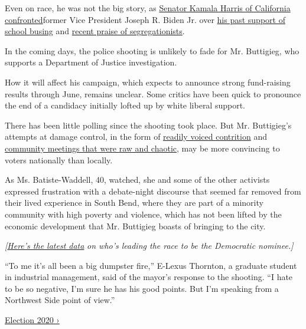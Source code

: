 Even on race, he was not the big story, as
\href{https://www.nytimes3xbfgragh.onion/2019/06/27/us/politics/kamala-harris-busing-joe-biden.html}{Senator
Kamala Harris of California confronted}former Vice President Joseph R.
Biden Jr. over
\href{https://www.nytimes3xbfgragh.onion/2019/06/27/us/politics/factcheck-democratic-debate.html}{his
past support of school busing} and
\href{https://www.nytimes3xbfgragh.onion/2019/06/20/us/politics/joe-biden-segregationists.html}{recent
praise of segregationists}.

In the coming days, the police shooting is unlikely to fade for Mr.
Buttigieg, who supports a Department of Justice investigation.

How it will affect his campaign, which expects to announce strong
fund-raising results through June, remains unclear. Some critics have
been quick to pronounce the end of a candidacy initially lofted up by
white liberal support.

There has been little polling since the shooting took place. But Mr.
Buttigieg's attempts at damage control, in the form of
\href{https://www.nytimes3xbfgragh.onion/2019/06/24/us/politics/pete-buttigieg-south-bend-shooting.html}{readily
voiced contrition} and
\href{https://www.nytimes3xbfgragh.onion/2019/06/23/us/politics/buttigieg-south-bend-shooting.html?searchResultPosition=1}{community
meetings that were raw and chaotic}, may be more convincing to voters
nationally than locally.

As Ms. Batiste-Waddell, 40, watched, she and some of the other activists
expressed frustration with a debate-night discourse that seemed far
removed from their lived experience in South Bend, where they are part
of a minority community with high poverty and violence, which has not
been lifted by the economic development that Mr. Buttigieg boasts of
bringing to the city.

\emph{{[}\href{https://www.nytimes3xbfgragh.onion/interactive/2020/us/elections/democratic-polls.html?action=click\&module=Intentional\&pgtype=Article}{Here's
the latest data}} \emph{on who's leading the race to be the Democratic
nominee.{]}}

``To me it's all been a big dumpster fire,'' E-Lexus Thornton, a
graduate student in industrial management, said of the mayor's response
to the shooting. ``I hate to be so negative, I'm sure he has his good
points. But I'm speaking from a Northwest Side point of view.''

\href{https://www.nytimes3xbfgragh.onion/news-event/2020-election}{Election
2020 ›}

